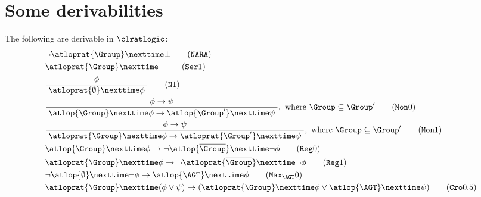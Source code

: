 \section{Some derivabilities}\label{section: some derivabilities}
\begin{theorem}
  The following are derivable in $\clratlogic$:
  \begin{align}  
    & 
    \neg \atloprat{\Group}\nexttime \bot \tag{$\mathtt{NARA}$} \label{NARA}
    \\
    & 
    \atloprat{\Group}\nexttime \top \tag{$\mathtt{Ser}1$} \label{Ser1}
    \\
    &
    \dfrac{\; \phi \;}
    {\; \atloprat{\emptyset }\nexttime \phi \;}
    \tag{$\mathtt{N}1$} \label{N1}
    \\
    & \dfrac{\;\phi\to\psi \;}{\;\atlop{\Group}\nexttime \phi \to \atlop{\Group'}\nexttime \psi \;},\text{ where }\Group\subseteq \Group' \tag{$\mathtt{Mon}0$} \label{Mon0}
    \\
    & 
    \dfrac{\;\phi\to\psi \;}{\;\atloprat{\Group}\nexttime \phi \to \atloprat{\Group'}\nexttime \psi\;},\text{ where }\Group\subseteq \Group'\tag{$\mathtt{Mon}1$} \label{Mon1}
    \\
    &
    \atlop{\Group }\nexttime \phi \to \neg \atlop{\overline{\Group }}\nexttime \neg \phi \tag{$\mathtt{Reg}0$} \label{Reg0} 
    \\
    &
    \atloprat{\Group }\nexttime \phi \to \neg \atloprat{\overline{\Group }}\nexttime \neg \phi \tag{$\mathtt{Reg}1$} \label{Reg1} 
    \\
    &
    \neg \atlop{\emptyset }\nexttime \neg \phi \to \atlop{\AGT}\nexttime \phi 
    \tag{$\mathtt{Max}_{\AGT}0$} \label{Max0} 
    \\ 
    &
    \atloprat{\Group} \nexttime (\phi \lor \psi) \rightarrow (\atloprat{\Group} \nexttime \phi \lor \atlop{\AGT} \nexttime \psi) 
    \tag{$\mathtt{Cro}0.5$} \label{Cro0.5}
  \end{align}
  \end{theorem}  
